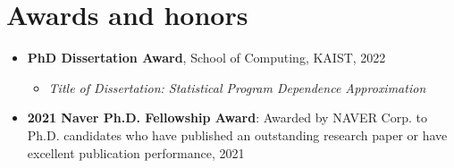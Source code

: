\documentclass[letterpaper,10pt]{article}
\begin{document}
\section{Awards and honors}
\begin{itemize}
  \item \textbf{PhD Dissertation Award}, School of Computing, KAIST, 2022
        \vspace{-5pt}\begin{itemize}
          \item \emph{Title of Dissertation: Statistical Program Dependence Approximation}
        \end{itemize}
  \item \textbf{2021 Naver Ph.D. Fellowship Award}: Awarded by NAVER Corp. to Ph.D. candidates who have published an outstanding research paper or have excellent publication performance, 2021
\end{itemize}


\end{document}
